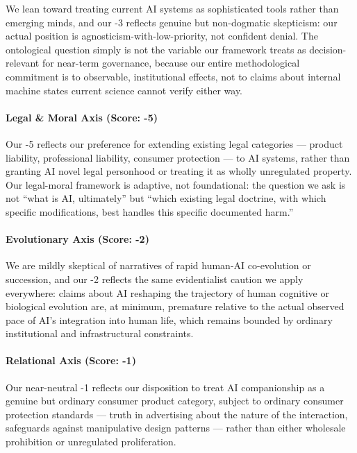 We lean toward treating current AI systems as sophisticated tools rather
than emerging minds, and our -3 reflects genuine but non-dogmatic
skepticism: our actual position is agnosticism-with-low-priority, not
confident denial. The ontological question simply is not the variable
our framework treats as decision-relevant for near-term governance,
because our entire methodological commitment is to observable,
institutional effects, not to claims about internal machine states
current science cannot verify either way.

\paragraph{Legal \& Moral Axis (Score:
-5)}\label{legal-moral-axis-score--5}

Our -5 reflects our preference for extending existing legal categories
--- product liability, professional liability, consumer protection ---
to AI systems, rather than granting AI novel legal personhood or
treating it as wholly unregulated property. Our legal-moral framework is
adaptive, not foundational: the question we ask is not ``what is AI,
ultimately'' but ``which existing legal doctrine, with which specific
modifications, best handles this specific documented harm.''

\paragraph{Evolutionary Axis (Score:
-2)}\label{evolutionary-axis-score--2-2}

We are mildly skeptical of narratives of rapid human-AI co-evolution or
succession, and our -2 reflects the same evidentialist caution we apply
everywhere: claims about AI reshaping the trajectory of human cognitive
or biological evolution are, at minimum, premature relative to the
actual observed pace of AI's integration into human life, which remains
bounded by ordinary institutional and infrastructural constraints.

\paragraph{Relational Axis (Score:
-1)}\label{relational-axis-score--1-2}

Our near-neutral -1 reflects our disposition to treat AI companionship
as a genuine but ordinary consumer product category, subject to ordinary
consumer protection standards --- truth in advertising about the nature
of the interaction, safeguards against manipulative design patterns ---
rather than either wholesale prohibition or unregulated proliferation.

